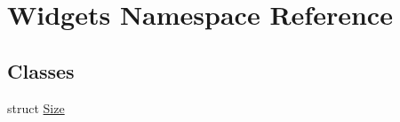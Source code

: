 \hypertarget{namespace_widgets}{}\section{Widgets Namespace Reference}
\label{namespace_widgets}
\subsection*{Classes}
\begin{DoxyCompactItemize}
\item 
struct \hyperlink{struct_widgets_1_1_size}{Size}
\end{DoxyCompactItemize}

